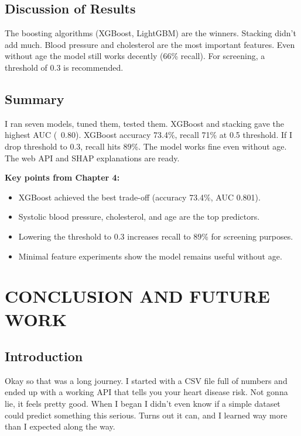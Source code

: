 \documentclass[11pt, a4paper, oneside]{book}
\begin{document}
\section{Discussion of Results}
The boosting algorithms (XGBoost, LightGBM) are the winners. Stacking didn't add much. Blood pressure and cholesterol are the most important features. Even without age the model still works decently (66\% recall). For screening, a threshold of 0.3 is recommended.

\section{Summary}
I ran seven models, tuned them, tested them. XGBoost and stacking gave the highest AUC (~0.80). XGBoost accuracy 73.4\%, recall 71\% at 0.5 threshold. If I drop threshold to 0.3, recall hits 89\%. The model works fine even without age. The web API and SHAP explanations are ready.

\begin{takeaway}
\textbf{Key points from Chapter 4:}
\begin{itemize}
  \item XGBoost achieved the best trade-off (accuracy 73.4\%, AUC 0.801).
  \item Systolic blood pressure, cholesterol, and age are the top predictors.
  \item Lowering the threshold to 0.3 increases recall to 89\% for screening purposes.
  \item Minimal feature experiments show the model remains useful without age.
\end{itemize}
\end{takeaway}

\chapter{CONCLUSION AND FUTURE WORK}

\section{Introduction}
Okay so that was a long journey. I started with a CSV file full of numbers and ended up with a working API that tells you your heart disease risk. Not gonna lie, it feels pretty good. When I began I didn’t even know if a simple dataset could predict something this serious. Turns out it can, and I learned way more than I expected along the way.
\end{document}
